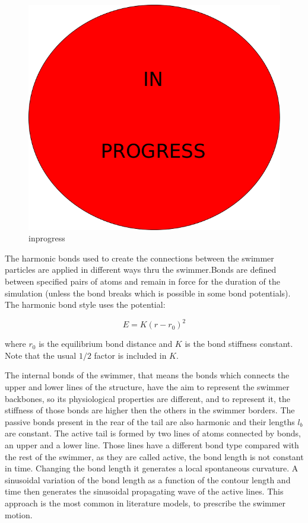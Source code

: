 \begin{figure}
\centering
  \begin{footnotesize}
  \includegraphics[scale=0.25]{images/in-progress.png}
  \caption[inprogress]{inprogress}
  \label{fig:Bild4}
  \end{footnotesize}
\end{figure} 

The harmonic bonds used to create the connections between the swimmer particles are applied in different ways thru the swimmer.Bonds are defined between specified pairs of 
atoms and remain in force for the duration of the simulation (unless the bond breaks which is possible in some bond potentials). The harmonic bond style uses the potential:


\begin{equation} 
  E = K ( r - r_{0})^2
\end{equation}

where $r_{0}$ is the equilibrium bond distance and $K$ is the bond stiffness constant. Note that the usual $1/2$ factor is included in $K$.

The internal bonds of the swimmer, that means the bonds which connects the upper and lower lines of the structure, have the aim to represent the swimmer backbones, so its 
physiological properties are different, and to represent it, the stiffness of those bonds are higher then the others in the swimmer borders. The passive bonds present in the 
rear of the tail are also harmonic and their lengths $l_{b}$ are constant. The active tail is formed by two lines of atoms connected by bonds, an upper and a lower line. Those
lines have a different bond type compared with the rest of the swimmer, as they are called active, the bond length is not constant in time. Changing the bond length it generates
a local spontaneous curvature. A sinusoidal variation of the bond length as a function of the contour length and time then generates the sinusoidal propagating wave of the active
lines. This approach is the most common in literature models, to prescribe the swimmer motion.\par

